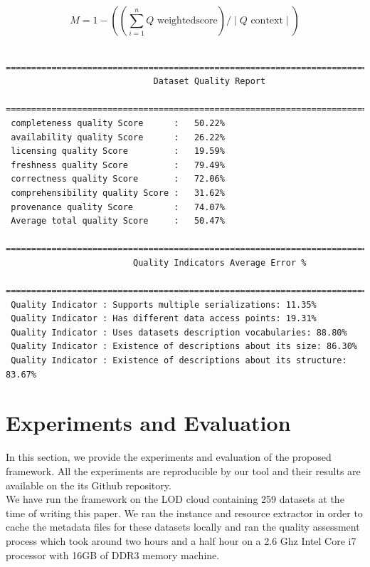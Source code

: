 \documentclass[onecolumn, crcready]{iosart2c}
\begin{document}
\begin{equation}
 M =  1 - ((\sum_{i=1}^{n} Q\textrm{ weightedscore}) / \mid Q\textrm{ context} \mid )
\end{equation}

\begin{lstlisting}
 =================================================================================
                             Dataset Quality Report
 =================================================================================
 completeness quality Score      :   50.22%
 availability quality Score      :   26.22%
 licensing quality Score         :   19.59%
 freshness quality Score         :   79.49%
 correctness quality Score       :   72.06%
 comprehensibility quality Score :   31.62%
 provenance quality Score        :   74.07%
 Average total quality Score     :   50.47%
 =================================================================================
                         Quality Indicators Average Error %
 =================================================================================
 Quality Indicator : Supports multiple serializations: 11.35%
 Quality Indicator : Has different data access points: 19.31%
 Quality Indicator : Uses datasets description vocabularies: 88.80%
 Quality Indicator : Existence of descriptions about its size: 86.30%
 Quality Indicator : Existence of descriptions about its structure: 83.67%
\end{lstlisting}

\section{Experiments and Evaluation}

In this section, we provide the experiments and evaluation of the proposed framework. All the experiments are reproducible by our tool and their results are available on the its Github repository.\\
We have run the framework on the LOD cloud containing 259 datasets at the time of writing this paper. We ran the instance and resource extractor in order to cache the metadata files for these datasets locally and ran the quality assessment process which took around two hours and a half hour on a 2.6 Ghz Intel Core i7 processor with 16GB of DDR3 memory machine.\\
\end{document}
